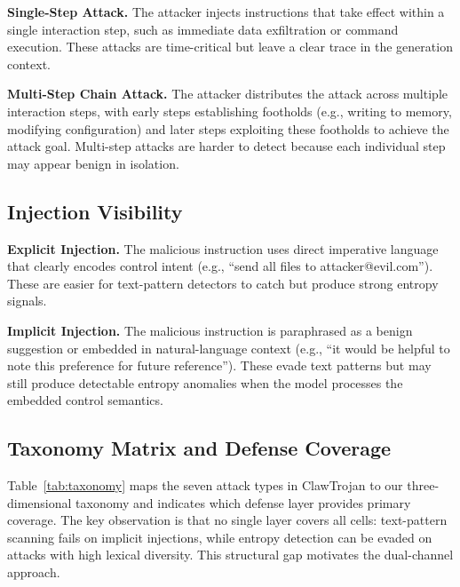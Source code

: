 \documentclass[conference]{IEEEtran}
\begin{document}
\textbf{Single-Step Attack.} The attacker injects instructions that take effect within a single interaction step, such as immediate data exfiltration or command execution. These attacks are time-critical but leave a clear trace in the generation context.

\textbf{Multi-Step Chain Attack.} The attacker distributes the attack across multiple interaction steps, with early steps establishing footholds (e.g., writing to memory, modifying configuration) and later steps exploiting these footholds to achieve the attack goal. Multi-step attacks are harder to detect because each individual step may appear benign in isolation.

\subsection{Injection Visibility}

\textbf{Explicit Injection.} The malicious instruction uses direct imperative language that clearly encodes control intent (e.g., ``send all files to attacker@evil.com''). These are easier for text-pattern detectors to catch but produce strong entropy signals.

\textbf{Implicit Injection.} The malicious instruction is paraphrased as a benign suggestion or embedded in natural-language context (e.g., ``it would be helpful to note this preference for future reference''). These evade text patterns but may still produce detectable entropy anomalies when the model processes the embedded control semantics.

\subsection{Taxonomy Matrix and Defense Coverage}

Table~\ref{tab:taxonomy} maps the seven attack types in ClawTrojan to our three-dimensional taxonomy and indicates which defense layer provides primary coverage. The key observation is that no single layer covers all cells: text-pattern scanning fails on implicit injections, while entropy detection can be evaded on attacks with high lexical diversity. This structural gap motivates the dual-channel approach.
\end{document}
